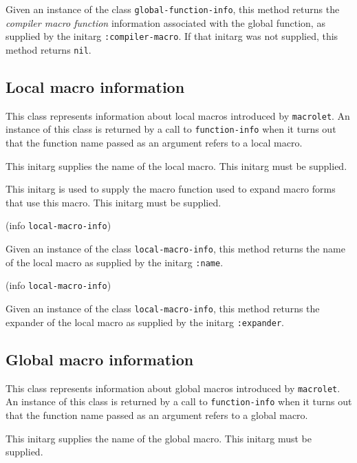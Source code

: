 Given an instance of the class \texttt{global-function-info}, this
method returns the \emph{compiler macro function} information
associated with the global function, as supplied by the initarg
\texttt{:compiler-macro}.  If that initarg was not supplied, this
method returns \texttt{nil}.

\subsection{Local macro information}


This class represents information about local macros introduced by
\texttt{macrolet}.  An instance of this class is returned by a call to
\texttt{function-info} when it turns out that the function name passed
as an argument refers to a local macro.


This initarg supplies the name of the local macro.  This initarg
must be supplied.


This initarg is used to supply the macro function used to expand macro
forms that use this macro.  This initarg must be supplied. 

 {(info {\tt local-macro-info})}

Given an instance of the class \texttt{local-macro-info}, this
method returns the name of the local macro as supplied by the
initarg \texttt{:name}.

 {(info {\tt local-macro-info})}

Given an instance of the class \texttt{local-macro-info}, this
method returns the expander of the local macro as supplied by the
initarg \texttt{:expander}.

\subsection{Global macro information}


This class represents information about global macros introduced by
\texttt{macrolet}.  An instance of this class is returned by a call to
\texttt{function-info} when it turns out that the function name passed
as an argument refers to a global macro.


This initarg supplies the name of the global macro.  This initarg
must be supplied.

